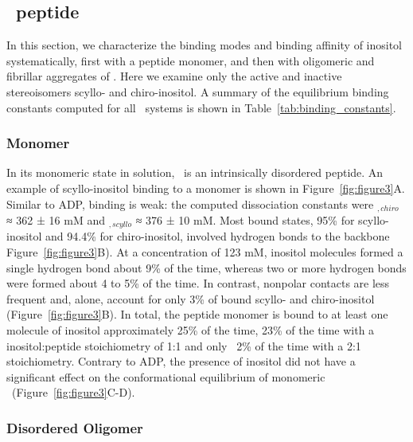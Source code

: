 \subsection{\gafour\ peptide}
In this section, we characterize the binding modes and binding affinity of inositol systematically, first with a peptide monomer, and then with oligomeric and fibrillar aggregates of \gafour. Here we examine only the active and inactive stereoisomers scyllo- and chiro-inositol. A summary of the equilibrium binding constants computed for all \gafour\ systems is shown in Table~\ref{tab:binding_constants}.

\subsubsection{Monomer}
In its monomeric state in solution, \gafour\ is an intrinsically disordered peptide.\cite{Nikolic:2011p57} An example of scyllo-inositol binding to a monomer is shown in Figure~\ref{fig:figure3}A. Similar to ADP, binding is weak: the computed dissociation constants were \KD$_{,chiro}$ ≈ 362 ± 16 mM and \KD$_{,scyllo}$ ≈ 376 ± 10 mM. Most bound states, 95\% for scyllo-inositol and 94.4\% for chiro-inositol, involved hydrogen bonds to the backbone Figure~\ref{fig:figure3}B). At a concentration of 123 mM, inositol molecules formed a single hydrogen bond about 9\% of the time, whereas two or more hydrogen bonds were formed about 4 to 5\% of the time. In contrast, nonpolar contacts are less frequent and, alone, account for only 3\% of bound scyllo- and chiro-inositol (Figure~\ref{fig:figure3}B). In total, the peptide monomer is bound to at least one molecule of inositol approximately 25\% of the time, 23\% of the time with a inositol:peptide stoichiometry of 1:1 and only ~2\% of the time with a 2:1 stoichiometry. Contrary to ADP, the presence of inositol did not have a significant effect on the conformational equilibrium of monomeric \gafour\ (Figure~\ref{fig:figure3}C-D).

\subsubsection{Disordered Oligomer}

